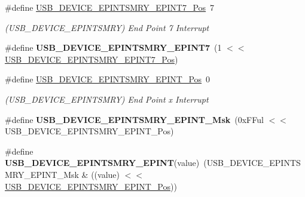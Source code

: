 \begin{DoxyCompactItemize}
\item 
\hypertarget{group___s_a_m_l21___u_s_b_gab9f6a1a4a3a47a939dfcc0dcc90ef3af}{}\#define \hyperlink{group___s_a_m_l21___u_s_b_gab9f6a1a4a3a47a939dfcc0dcc90ef3af}{U\+S\+B\+\_\+\+D\+E\+V\+I\+C\+E\+\_\+\+E\+P\+I\+N\+T\+S\+M\+R\+Y\+\_\+\+E\+P\+I\+N\+T7\+\_\+\+Pos}~7\label{group___s_a_m_l21___u_s_b_gab9f6a1a4a3a47a939dfcc0dcc90ef3af}

\begin{DoxyCompactList}\small\item\em (U\+S\+B\+\_\+\+D\+E\+V\+I\+C\+E\+\_\+\+E\+P\+I\+N\+T\+S\+M\+R\+Y) End Point 7 Interrupt \end{DoxyCompactList}\item 
\hypertarget{group___s_a_m_l21___u_s_b_ga3caa9dcc3265ab9c00ed91f1a62dd086}{}\#define {\bfseries U\+S\+B\+\_\+\+D\+E\+V\+I\+C\+E\+\_\+\+E\+P\+I\+N\+T\+S\+M\+R\+Y\+\_\+\+E\+P\+I\+N\+T7}~(1 $<$$<$ \hyperlink{group___s_a_m_l21___u_s_b_gab9f6a1a4a3a47a939dfcc0dcc90ef3af}{U\+S\+B\+\_\+\+D\+E\+V\+I\+C\+E\+\_\+\+E\+P\+I\+N\+T\+S\+M\+R\+Y\+\_\+\+E\+P\+I\+N\+T7\+\_\+\+Pos})\label{group___s_a_m_l21___u_s_b_ga3caa9dcc3265ab9c00ed91f1a62dd086}

\item 
\hypertarget{group___s_a_m_l21___u_s_b_ga6527db8bbe4ee6e8a5f375af2aa127e4}{}\#define \hyperlink{group___s_a_m_l21___u_s_b_ga6527db8bbe4ee6e8a5f375af2aa127e4}{U\+S\+B\+\_\+\+D\+E\+V\+I\+C\+E\+\_\+\+E\+P\+I\+N\+T\+S\+M\+R\+Y\+\_\+\+E\+P\+I\+N\+T\+\_\+\+Pos}~0\label{group___s_a_m_l21___u_s_b_ga6527db8bbe4ee6e8a5f375af2aa127e4}

\begin{DoxyCompactList}\small\item\em (U\+S\+B\+\_\+\+D\+E\+V\+I\+C\+E\+\_\+\+E\+P\+I\+N\+T\+S\+M\+R\+Y) End Point x Interrupt \end{DoxyCompactList}\item 
\hypertarget{group___s_a_m_l21___u_s_b_ga289c32a39d1bc9cd57a7db52056614e4}{}\#define {\bfseries U\+S\+B\+\_\+\+D\+E\+V\+I\+C\+E\+\_\+\+E\+P\+I\+N\+T\+S\+M\+R\+Y\+\_\+\+E\+P\+I\+N\+T\+\_\+\+Msk}~(0x\+F\+Ful $<$$<$ U\+S\+B\+\_\+\+D\+E\+V\+I\+C\+E\+\_\+\+E\+P\+I\+N\+T\+S\+M\+R\+Y\+\_\+\+E\+P\+I\+N\+T\+\_\+\+Pos)\label{group___s_a_m_l21___u_s_b_ga289c32a39d1bc9cd57a7db52056614e4}

\item 
\hypertarget{group___s_a_m_l21___u_s_b_ga324830608ce5508d668825cff77a7b80}{}\#define {\bfseries U\+S\+B\+\_\+\+D\+E\+V\+I\+C\+E\+\_\+\+E\+P\+I\+N\+T\+S\+M\+R\+Y\+\_\+\+E\+P\+I\+N\+T}(value)~(U\+S\+B\+\_\+\+D\+E\+V\+I\+C\+E\+\_\+\+E\+P\+I\+N\+T\+S\+M\+R\+Y\+\_\+\+E\+P\+I\+N\+T\+\_\+\+Msk \& ((value) $<$$<$ \hyperlink{group___s_a_m_l21___u_s_b_ga6527db8bbe4ee6e8a5f375af2aa127e4}{U\+S\+B\+\_\+\+D\+E\+V\+I\+C\+E\+\_\+\+E\+P\+I\+N\+T\+S\+M\+R\+Y\+\_\+\+E\+P\+I\+N\+T\+\_\+\+Pos}))\label{group___s_a_m_l21___u_s_b_ga324830608ce5508d668825cff77a7b80}


\end{DoxyCompactItemize}
